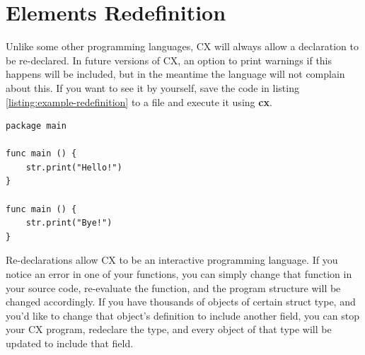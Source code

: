 \documentclass[11pt,fleqn,openany]{book} %
\begin{document}
\section{Elements Redefinition}


Unlike some other programming languages, CX will always allow a declaration to be re-declared. In future versions of CX, an option to print warnings if this happens will be included, but in the meantime the language will not complain about this. If you want to see it by yourself, save the code in listing \ref{listing:example-redefinition} to a file and execute it using \textbf{cx}.

\begin{lstlisting}[caption={Example of function redefinition},captionpos=b,label={listing:example-redefinition}]
package main

func main () {
	str.print("Hello!")
}

func main () {
	str.print("Bye!")
}
\end{lstlisting}

Re-declarations allow CX to be an interactive programming language. If you notice an error in one of your functions, you can simply change that function in your source code, re-evaluate the function, and the program structure will be changed accordingly. If you have thousands of objects of certain struct type, and you'd like to change that object's definition to include another field, you can stop your CX program, redeclare the type, and every object of that type will be updated to include that field.

\end{document}
